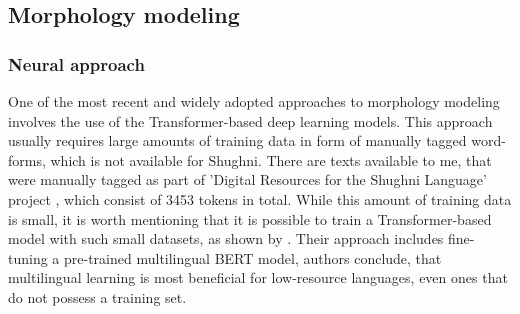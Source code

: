 \subsection{Morphology modeling}
\subsubsection{Neural approach}
\par One of the most recent and widely adopted approaches to morphology modeling involves the use of the Transformer-based deep learning models. This approach usually requires large amounts of training data in form of manually tagged word-forms, which is not available for Shughni. There are texts available to me, that were manually tagged as part of 'Digital Resources for the Shughni Language' project \parencite{makarov_digital_2022}, which consist of 3453 tokens in total. While this amount of training data is small, it is worth mentioning that it is possible to train a Transformer-based model with such small datasets, as shown by \cite{kondratyuk_straka_model_2019}. Their approach includes fine-tuning a pre-trained multilingual BERT model, authors conclude, that multilingual learning is most beneficial for low-resource languages, even ones that do not possess a training set.

